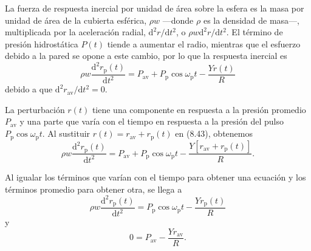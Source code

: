 \documentclass[12pt]{book}
\begin{document}
La fuerza de respuesta inercial por unidad de área sobre la esfera es la masa por unidad de área de la cubierta esférica, $\rho w$ ---donde $\rho$ es la densidad de masa---, multiplicada por la aceleración radial, $\mathrm{d}^2 r/\mathrm{d}t^2$, o $\rho w \mathrm{d}^2 r/\mathrm{d}t^2$. El término de presión hidrostática $P(t)$ tiende a aumentar el radio, mientras que el esfuerzo debido a la pared se opone a este cambio, por lo que la respuesta inercial es
\begin{equation}
\rho w \frac{\mathrm{d}^2 r_{\text{p}}(t)}{\mathrm{d}t^2} = P_{\text{av}} + P_{\text{p}} \cos\omega_{\text{p}} t - \frac{Y r(t)}{R}
\label{eq:843}
\end{equation}
debido a que $\mathrm{d}^2 r_{\text{av}}/\mathrm{d}t^2 = 0$.

La perturbación $r(t)$ tiene una componente en respuesta a la presión promedio $P_{\text{av}}$ y una parte que varía con el tiempo en respuesta a la presión del pulso $P_{\text{p}} \cos\omega_{\text{p}} t$. Al sustituir $r(t) = r_{\text{av}} + r_{\text{p}}(t)$ en (8.43), obtenemos
\begin{equation}
\rho w \frac{\mathrm{d}^2 r_{\text{p}}(t)}{\mathrm{d}t^2} = P_{\text{av}} + P_{\text{p}} \cos\omega_{\text{p}} t - \frac{Y [r_{\text{av}} + r_{\text{p}}(t)]}{R}.
\label{eq:844}
\end{equation}

Al igualar los términos que varían con el tiempo para obtener una ecuación y los términos promedio para obtener otra, se llega a
\begin{equation}
\rho w \frac{\mathrm{d}^2 r_{\text{p}}(t)}{\mathrm{d}t^2} = P_{\text{p}} \cos\omega_{\text{p}} t - \frac{Y r_{\text{p}}(t)}{R}
\label{eq:845}
\end{equation}
y
\begin{equation}
0 = P_{\text{av}} - \frac{Y r_{\text{av}}}{R}.
\label{eq:846}
\end{equation}
\end{document}
